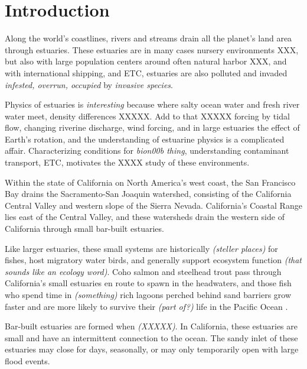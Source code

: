 \chapter{Introduction}
\label{chIntro}

Along the world's coastlines, rivers and streams drain all the planet's land area through estuaries.  These estuaries are in many cases nursery environments XXX, but also with large population centers around often natural harbor XXX, and with international shipping, and ETC, estuaries are also polluted and invaded \emph{infested, overrun, occupied} by \emph{invasive species}. 

Physics of estuaries is \emph{interesting} because where salty ocean water and fresh river water meet, density differences XXXXX. Add to that XXXXX forcing by tidal flow, changing riverine discharge, wind forcing, and in large estuaries the effect of Earth's rotation, and the understanding of estuarine physics is a complicated affair. Characterizing conditions for \emph{bion00b thing}, understanding contaminant transport, ETC, motivates the XXXX study of these environments. 

Within the state of California on North America's west coast, the San Francisco Bay drains the Sacramento-San Joaquin watershed, consisting of the California Central Valley and western slope of the Sierra Nevada. California's Coastal Range lies east of the Central Valley, and these watersheds drain the western side of California through small bar-built estuaries.

Like larger estuaries, these small systems are historically \emph{(steller places)} for fishes, host migratory water birds, and generally support ecosystem function \emph{(that sounds like an ecology word)}. Coho salmon and steelhead trout pass through California's small estuaries en route to spawn in the headwaters, and those fish who spend time in \emph{(something)} rich lagoons perched behind sand barriers grow faster and are more likely to survive their \emph{(part of?)} life in the Pacific Ocean \parencite{hayes_steelhead_2008, bond_marine_2008}. 

Bar-built estuaries are formed when \emph{(XXXXX)}. In California, these estuaries are small and have an intermittent connection to the ocean. The sandy inlet of these estuaries may close for days, seasonally, or may only temporarily open with large flood events. 

